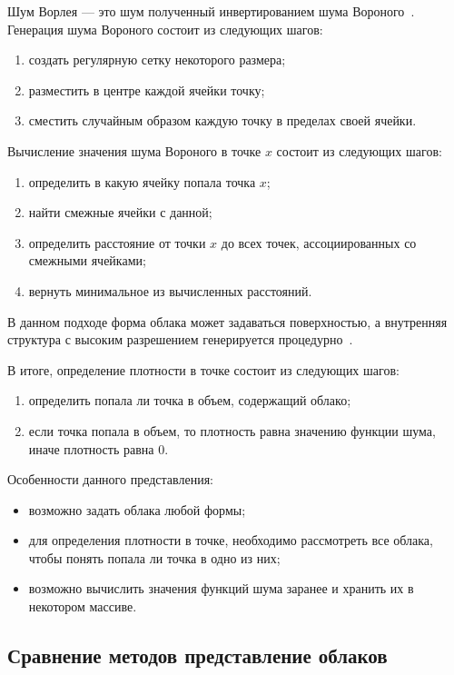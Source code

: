 Шум Ворлея --- это шум полученный инвертированием шума Вороного~\cite{worley}. Генерация шума Вороного состоит из следующих шагов:
\begin{enumerate}
	\item создать регулярную сетку некоторого размера;
	\item разместить в центре каждой ячейки точку;
	\item сместить случайным образом каждую точку в пределах своей ячейки.
\end{enumerate}
Вычисление значения шума Вороного в точке $x$ состоит из следующих шагов:
\begin{enumerate}
	\item определить в какую ячейку попала точка $x$;
	\item найти смежные ячейки с данной;
	\item определить расстояние от точки $x$ до всех точек, ассоциированных со смежными ячейками;
	\item вернуть минимальное из вычисленных расстояний.
\end{enumerate}

В данном подходе форма облака может задаваться поверхностью, а внутренняя структура с высоким разрешением генерируется процедурно~\mbox{\cite{implicit, hzd, frostbite, clouds}}. 

В итоге, определение плотности в точке состоит из следующих шагов:
 \begin{enumerate}
	\item определить попала ли точка в объем, содержащий облако;
	\item если точка попала в объем, то плотность равна значению функции шума, иначе плотность равна 0.
\end{enumerate}

Особенности данного представления:
\begin{itemize}
	\item возможно задать облака любой формы;
	\item для определения плотности в точке, необходимо рассмотреть все облака, чтобы понять попала ли точка в одно из них;
	\item возможно вычислить значения функций шума заранее и хранить их в некотором массиве. 
\end{itemize}


\subsection{Сравнение методов представление облаков}

